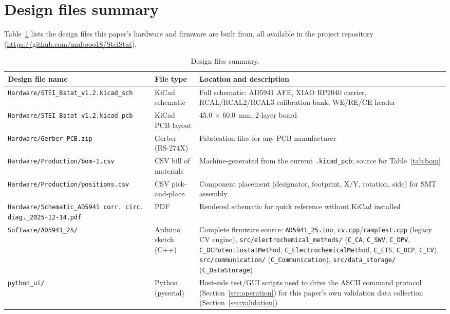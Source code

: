 \section{Design files summary}
\label{sec:design-files}

Table~\ref{tab:designfiles} lists the design files this paper's hardware
and firmware are built from, all available in the project repository
(\url{https://github.com/mabooo18/SteiStat}).

\begin{table}[H]
\centering
\footnotesize
\setlength{\tabcolsep}{4pt}
\caption{Design files summary.}
\label{tab:designfiles}
\begin{tabular}{@{}p{3.4cm}p{2.2cm}p{7.8cm}@{}}
\toprule
Design file name & File type & Location and description \\
\midrule
\texttt{Hardware/\allowbreak STEI\_Bstat\_v1.2.kicad\_sch} & KiCad schematic &
  Full schematic: AD5941 AFE, XIAO RP2040 carrier, RCAL/RCAL2/RCAL3
  calibration bank, WE/RE/CE header \\
\texttt{Hardware/\allowbreak STEI\_Bstat\_v1.2.kicad\_pcb} & KiCad PCB layout &
  \SI{45.0}{} $\times$ \SI{60.0}{\milli\metre}, 2-layer board \\
\texttt{Hardware/\allowbreak Gerber\_PCB.zip} & Gerber (RS-274X) &
  Fabrication files for any PCB manufacturer \\
\texttt{Hardware/\allowbreak Production/\allowbreak bom-1.csv} & CSV bill of materials & Machine-generated
  from the current \texttt{.kicad\_pcb}; source for Table~\ref{tab:bom} \\
\texttt{Hardware/\allowbreak Production/\allowbreak positions.csv} & CSV pick-and-place & Component
  placement (designator, footprint, X/Y, rotation, side) for SMT assembly \\
\texttt{Hardware/\allowbreak Schematic\_AD5941 corr. circ. diag.\_2025-12-14.pdf} & PDF & Rendered
  schematic for quick reference without KiCad installed \\
\texttt{Software/\allowbreak AD5941\_25/} & Arduino sketch (C++) & Complete firmware source:
  \texttt{AD5941\_25.ino}, \texttt{cv.cpp}/\texttt{rampTest.cpp} (legacy CV
  engine), \texttt{src/electrochemical\_methods/} (\texttt{C\_CA},
  \texttt{C\_SWV}, \texttt{C\_DPV}, \texttt{C\_DCPotentiostatMethod},
  \texttt{C\_ElectrochemicalMethod}, \texttt{C\_EIS}, \texttt{C\_OCP},
  \texttt{C\_CV}), \texttt{src/communication/} (\texttt{C\_Communication}),
  \texttt{src/data\_storage/} (\texttt{C\_DataStorage}) \\
\texttt{python\_ui/} & Python (pyserial) & Host-side test/GUI scripts used
  to drive the ASCII command protocol (Section~\ref{sec:operation}) for
  this paper's own validation data collection (Section~\ref{sec:validation}) \\
\bottomrule
\end{tabular}
\end{table}
